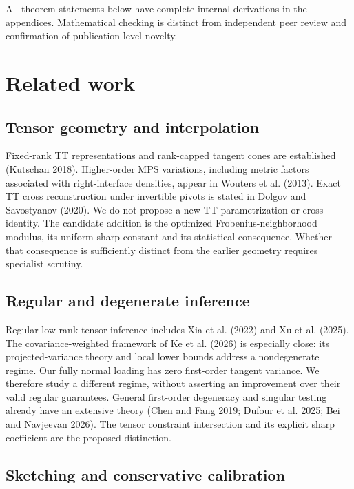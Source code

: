\documentclass[
  11pt,
]{article}
\begin{document}
All theorem statements below have complete internal derivations in the
appendices. Mathematical checking is distinct from independent peer
review and confirmation of publication-level novelty.

\section{Related work}\label{related-work}

\subsection{Tensor geometry and
interpolation}\label{tensor-geometry-and-interpolation}

Fixed-rank TT representations and rank-capped tangent cones are
established (Kutschan 2018). Higher-order MPS variations, including
metric factors associated with right-interface densities, appear in
Wouters et al. (2013). Exact TT cross reconstruction under invertible
pivots is stated in Dolgov and Savostyanov (2020). We do not propose a
new TT parametrization or cross identity. The candidate addition is the
optimized Frobenius-neighborhood modulus, its uniform sharp constant and
its statistical consequence. Whether that consequence is sufficiently
distinct from the earlier geometry requires specialist scrutiny.

\subsection{Regular and degenerate
inference}\label{regular-and-degenerate-inference}

Regular low-rank tensor inference includes Xia et al. (2022) and Xu et
al. (2025). The covariance-weighted framework of Ke et al. (2026) is
especially close: its projected-variance theory and local lower bounds
address a nondegenerate regime. Our fully normal loading has zero
first-order tangent variance. We therefore study a different regime,
without asserting an improvement over their valid regular guarantees.
General first-order degeneracy and singular testing already have an
extensive theory (Chen and Fang 2019; Dufour et al. 2025; Bei and
Navjeevan 2026). The tensor constraint intersection and its explicit
sharp coefficient are the proposed distinction.

\subsection{Sketching and conservative
calibration}\label{sketching-and-conservative-calibration}
\end{document}
